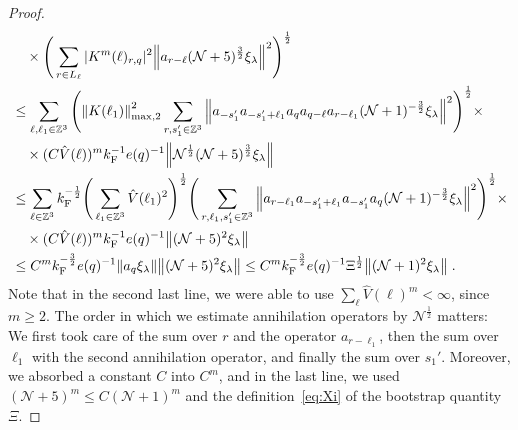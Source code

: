 \documentclass[12pt,a4paper]{article}
\numberwithin{equation}{section}
\newcommand{\cN}{\mathcal{N}}
\newcommand{\1}{\mathbb{I}}
\newcommand{\F}{\mathrm{F}}
\newcommand{\kF}{k_\F}
\newcommand{\Zstar}{\mathbb{Z}^3} %
\newcommand{\Z}{\mathbb{Z}}
\newcommand{\NN}{\mathcal{N}}
\newcommand{\half}{\frac{1}{2}}
\theoremstyle{plain}
\theoremstyle{definition}
\theoremstyle{remark}
\theoremstyle{plain}
\theoremstyle{definition}
\theoremstyle{remark}
\begin{document}
\begin{proof}
\begin{align}
	&\quad \times \Bigg( \sum\limits_{r \in L_\ell} |K^{m}(\ell)_{r,q}|^2 \norm{ a_{r-\ell} (\NN+5)^{\frac 32}\xi_\lambda }^2\Bigg)^\half \nonumber\\
	&\leq \sum_{\ell,\ell_1 \in \Zstar} \Bigg( \norm{K(\ell_1)}_{\max,2}^2 \sum\limits_{r, s_1' \in \Z^3} \norm{ a_{-s_1'} a_{-s_1' + \ell_1} a_q a_{q-\ell} a_{r-\ell_1} (\NN+1)^{-\frac 32}\xi_\lambda}^2\Bigg)^\half \times\nonumber\\
	& \quad \times (C \hat{V}(\ell))^m \kF^{-1} e(q)^{-1} \norm{ \NN^\half(\NN+5)^{\frac 32}\xi_\lambda } \nonumber\\
	&\leq \sum_{\ell \in \Zstar} \kF^{-\half} \Bigg( \sum_{\ell_1 \in \Zstar} \hat{V}(\ell_1)^2 \Bigg)^{\half}
		\Bigg( \sum_{r,\ell_1,s_1' \in \Z^3}
		\norm{ a_{r-\ell_1} a_{-s_1'+\ell_1} a_{-s_1'} a_q  (\NN+1)^{-\frac 32}\xi_\lambda}^2\Bigg)^\half \times\nonumber\\
	& \quad \times (C \hat{V}(\ell))^m \kF^{-1} e(q)^{-1} \norm{ (\NN+5)^2 \xi_\lambda } \nonumber\\
	&\leq C^m \kF^{-\frac 32} e(q)^{-1}
		\norm{ a_q \xi_\lambda} \norm{(\NN+5)^2 \xi_\lambda}
	\leq C^m \kF^{-\frac 32} e(q)^{-1} \Xi^\half
	 	\norm { (\NN+1)^2 \xi_\lambda } \;.\label{eq:estEQ1111}
\end{align}
Note that in the second last line, we were able to use $ \sum_\ell \hat{V}(\ell)^m < \infty $, since $ m \ge 2 $.
The order in which we estimate annihilation operators by $ \cN^\half $ matters: We first took care of the sum over $r$ and the operator $a_{r-\ell_1}$, then the sum over $\ell_1$ with the second annihilation operator, and finally the sum over $ s_1' $.
Moreover, we absorbed a constant $ C $ into $ C^m $, and in the last line, we used $ (\cN+5)^m \le C (\cN+1)^m $ and the definition~\eqref{eq:Xi} of the bootstrap quantity $ \Xi $.


\end{proof}
\end{document}
